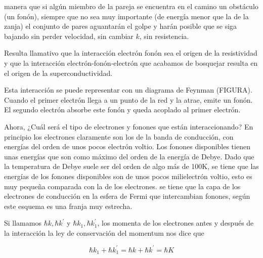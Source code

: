 manera que si algún miembro de la pareja se encuentra en el camino un obstáculo (un fonón), siempre que no sea muy importante (de energía menor que la de la zanja) el conjunto de pares aguantarán el golpe y harán posible que se siga bajando sin perder velocidad, sin cambiar $k$, sin resistencia.\color{black}

Resulta llamativo que la interacción electrón fonón sea el origen de la resistividad y que la interacción electrón-fonón-electrón que acabamos de bosquejar resulta en el origen de la superconductividad.

Esta interacción se puede representar con un diagrama de Feynman (FIGURA). Cuando el primer electrón llega a un punto de la red y la atrae, emite un fonón. El segundo electrón absorbe este fonón y queda acoplado al primer electrón.

Ahora, ¿Cuál será el tipo de electrones y fonones que están interaccionando? En principio los electrones claramente son los de la banda de conducción, con energías del orden de unos pocos electrón voltio. Los fonones disponibles tienen unas energías que son como máximo del orden de \color{red}la energía de Debye\color{black}. Dado que la temperatura de Debye suele ser del orden de algo más de 100K, se tiene que las energías de los fonones disponibles son de unos pocos milielectrón voltio, esto es muy pequeña comparada con la de los electrones. se tiene que la capa de los electrones de conducción en la esfera de Fermi que intercambian fonones, según este esquema es una franja muy estrecha.


Si llamamos $\hbar k, \hbar k^\prime$ y $\hbar k_1, \hbar k_1^\prime$, los momenta de los electrones antes y después de la interacción la ley de conservación del momentum nos dice que

\begin{equation*}
    \hbar k_1 + \hbar k_1^\prime = \hbar k + \hbar k^\prime = \hbar K
\end{equation*}

